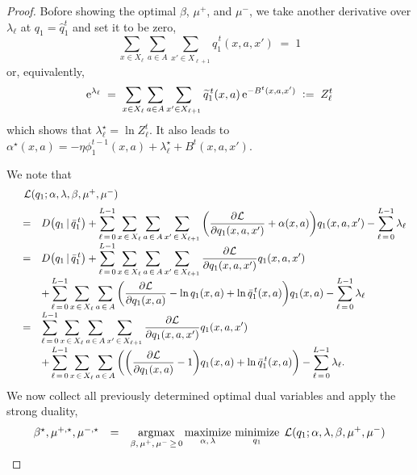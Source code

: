 \documentclass[12pt, final]{l4dc2023}
\begin{document}
\begin{proof}
	Bofore showing the optimal $\beta$, $\mu^+$, and $\mu^-$, we take another derivative over $\lambda_\ell$ at $q_1=\hat q_1^t$ and set it to be zero,
	\[
	\sum_{x\in X_\ell}\sum_{a\in A}\sum_{x'\in X_{\ell+1}} \hat q_1^{\,t}(x, a, x') \;=\;1
	\]
	or, equivalently,
	\[
	{\rm e}^{\lambda_\ell} \;=\; \sum_{x\in X_\ell}\sum_{a\in A}\sum_{x'\in X_{\ell+1}}  \widetilde q_1^{\,t}(x,a)\,{\rm e}^{-B^{t}(x,a,x')}\;\mathrel{\mathop:}=\; Z_\ell^t
	\]
	which shows that $\lambda_\ell^\star = \ln Z_\ell^t$. It also leads to $\alpha^\star(x,a)=-\eta \phi_1^{t-1}(x,a)+\lambda_\ell^\star+B^{t}(x,a,x')$.
	
	We note that 
	\[
	\begin{array}{rcl}
	&&\!\!\!\! \!\!\!\! \!\!
	\calL(q_1; \alpha, \lambda,\beta,\mu^+,\mu^-)  
	\\[0.2cm]
	&=& \displaystyle
	D\big(q_1\,\vert\,  \bar{q}_1^{\,t}\big)+ \sum_{\ell\,=\,0}^{L-1}\sum_{x\,\in\,X_\ell}\sum_{a\,\in\, A}\sum_{x'\,\in\,X_{\ell+1}} \bigg(\frac{\partial \mathcal{L}}{\partial q_1(x,a,x') } + \alpha(x,a) \bigg)q_1(x,a,x')-\sum_{\ell\,=\,0}^{L-1} \lambda_\ell
	\\[0.2cm]
	&=&  \displaystyle D\big(q_1\,\vert\,  \bar{q}_1^{\,t}\big)+
	\sum_{\ell\,=\,0}^{L-1}\sum_{x\,\in\,X_\ell}\sum_{a\,\in\, A}\sum_{x'\,\in\,X_{\ell+1}} \frac{\partial \mathcal{L}}{\partial q_1(x,a,x') }q_1(x,a,x')
	\\[0.2cm]
	&& \displaystyle
	+\sum_{\ell\,=\,0}^{L-1}\sum_{x\,\in\,X_\ell}\sum_{a\,\in\, A} \bigg(\frac{\partial \mathcal{L}}{\partial q_1(x,a) }- \ln q_1(x,a)+\ln \bar q_1^{\,t}(x,a) \bigg) q_1(x,a)
	-\sum_{\ell\,=\,0}^{L-1} \lambda_\ell
	\\[0.2cm]
	&=&  \displaystyle 
	\sum_{\ell\,=\,0}^{L-1}\sum_{x\,\in\,X_\ell}\sum_{a\,\in\, A}\sum_{x'\,\in\,X_{\ell+1}} \frac{\partial \mathcal{L}}{\partial q_1(x,a,x') }q_1(x,a,x')
	\\[0.2cm]
	&& \displaystyle
	+\sum_{\ell\,=\,0}^{L-1}\sum_{x\,\in\,X_\ell}\sum_{a\,\in\, A} \bigg(\bigg(\frac{\partial \mathcal{L}}{\partial q_1(x,a) }-1\bigg)  q_1(x,a)+\ln \bar q_1^{\,t}(x,a) \bigg) 
	-\sum_{\ell\,=\,0}^{L-1} \lambda_\ell.
	\end{array}
	\]
	We now collect all previously determined optimal dual variables and apply the strong duality,
	\[
	\begin{array}{rcl}
	\beta^\star, \mu^{+,\star}, \mu^{-,\star}
	&=&\displaystyle
	\operatorname*{argmax}_{\beta,\, \mu^+,\,\mu^-\,\geq \,0} \operatorname*{maximize}_{\alpha,\,\lambda}\,\operatorname*{minimize}_{q_1}\; {\mathcal{L}}(q_1; \alpha, \lambda,\beta,\mu^+,\mu^-)
	\\[0.2cm]

\end{array}\]
\end{proof}
\end{document}
